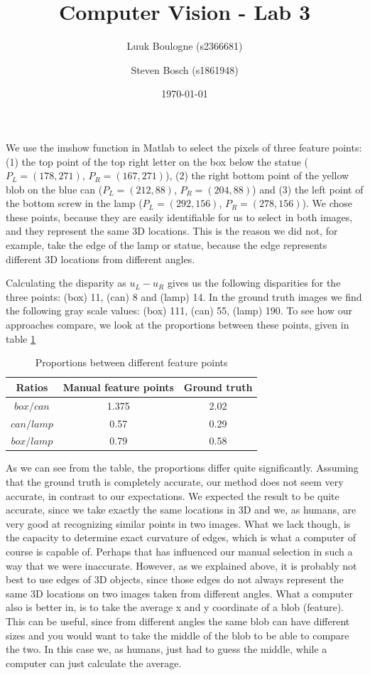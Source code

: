 \documentclass{article}
\title{Computer Vision - Lab 3}
\author{Luuk Boulogne (s2366681) \and Steven Bosch (s1861948)}
\date{\today}
\begin{document}
\maketitle

\section{}
We use the imshow function in Matlab to select the pixels of three feature points: (1) the top point of the top right letter on the box below the statue ($P_L = (178,271)$, $P_R = (167,271)$), (2) the right bottom point of the yellow blob on the blue can ($P_L = (212, 88)$, $P_R = (204, 88)$) and (3) the left point of the bottom screw in the lamp ($P_L = (292,156)$, $P_R = (278,156)$). We chose these points, because they are easily identifiable for us to select in both images, and they represent the same 3D locations. This is the reason we did not, for example, take the edge of the lamp or statue, because the edge represents different 3D locations from different angles. 

Calculating the disparity as $u_L - u_R$ gives us the following disparities for the three points: (box) 11, (can) 8 and (lamp) 14. In the ground truth images we find the following gray scale values: (box) 111, (can) 55, (lamp) 190. To see how our approaches compare, we look at the proportions between these points, given in table \ref{table1}

\begin{table}[!ht]
 \centering
 \caption{Proportions between different feature points}
 \begin{tabular}{c|c|c}
 Ratios & Manual feature points & Ground truth \\
 \hline
 $box/can$ & 1.375 & 2.02 \\
 $can/lamp$ & 0.57 & 0.29 \\
 $box/lamp$ & 0.79 & 0.58
 \end{tabular}
 \label{table1}
\end{table}

As we can see from the table, the proportions differ quite significantly. Assuming that the ground truth is completely accurate, our method does not seem very accurate, in contrast to our expectations. We expected the result to be quite accurate, since we take exactly the same locations in 3D and we, as humans, are very good at recognizing similar points in two images. What we lack though, is the capacity to determine exact curvature of edges, which is what a computer of course is capable of. Perhaps that has influenced our manual selection in such a way that we were inaccurate. However, as we explained above, it is probably not best to use edges of 3D objects, since those edges do not always represent the same 3D locations on two images taken from different angles. What a computer also is better in, is to take the average x and y coordinate of a blob (feature). This can be useful, since from different angles the same blob can have different sizes and you would want to take the middle of the blob to be able to compare the two. In this case we, as humans, just had to guess the middle, while a computer can just calculate the average.
\end{document}

